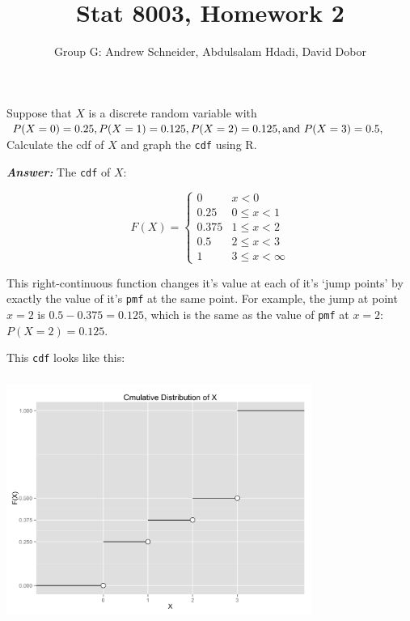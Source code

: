 \documentclass[12pt]{article}
\newenvironment{question}[2][Question]{\begin{trivlist}
\item[\hskip \labelsep {\bfseries #1}\hskip \labelsep {\bfseries #2.}]}{\end{trivlist}}
\begin{document}
 

 
\title{Stat 8003, Homework 2}%
\author{Group G: Andrew Schneider,  Abdulsalam Hdadi, David Dobor
\\ %
} %
 
\maketitle
 
 
\begin{question}{2.1} %
Suppose that $X$ is a discrete random variable with $P (X= 0) = 0.25, \\P (X = 1) = 0.125, P (X = 2) = 0.125, \text{and } P(X = 3) = 0.5, $ Calculate the cdf of $X$ and graph the \texttt{cdf} using $\mathrm{R}$.
\end{question}
 
 \textbf{\color{TealBlue}\emph{Answer:} } 
  The \texttt{cdf} of $X$: 
 
 \[ 
 F(X) = 
  \begin{cases} 
       0   & x <  0 \\
      0.25 & 0\leq x < 1 \\
      0.375 & 1\leq x < 2\\
      0.5 & 2\leq x < 3\\
      1 & 3\leq x < \infty 
   \end{cases}
\]
 
 This right-continuous function changes it's value at each of it's `jump points' by exactly the value of it's \texttt{pmf} at the same point. For example, the jump at point $ x = 2 $ is $0.5 - 0.375 = 0.125$, which is the same as the value of \texttt{pmf} at  $ x = 2$: $P (X = 2) = 0.125.$ 
 
 This \texttt{cdf} looks like this:
 
 \begin{center}
\includegraphics[width=10cm, height=8cm]{cdf_plot}
\end{center}
\end{document}
